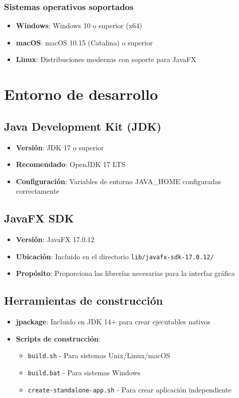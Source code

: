 \subsubsection{Sistemas operativos soportados}
\begin{itemize}
    \item \textbf{Windows}: Windows 10 o superior (x64)
    \item \textbf{macOS}: macOS 10.15 (Catalina) o superior
    \item \textbf{Linux}: Distribuciones modernas con soporte para JavaFX
\end{itemize}

\section{Entorno de desarrollo}

\subsection{Java Development Kit (JDK)}
\begin{itemize}
    \item \textbf{Versión}: JDK 17 o superior
    \item \textbf{Recomendado}: OpenJDK 17 LTS
    \item \textbf{Configuración}: Variables de entorno JAVA\_HOME configuradas correctamente
\end{itemize}

\subsection{JavaFX SDK}
\begin{itemize}
    \item \textbf{Versión}: JavaFX 17.0.12
    \item \textbf{Ubicación}: Incluido en el directorio \texttt{lib/javafx-sdk-17.0.12/}
    \item \textbf{Propósito}: Proporciona las librerías necesarias para la interfaz gráfica
\end{itemize}

\subsection{Herramientas de construcción}
\begin{itemize}
    \item \textbf{jpackage}: Incluido en JDK 14+ para crear ejecutables nativos
    \item \textbf{Scripts de construcción}: 
    \begin{itemize}
        \item \texttt{build.sh} - Para sistemas Unix/Linux/macOS
        \item \texttt{build.bat} - Para sistemas Windows
        \item \texttt{create-standalone-app.sh} - Para crear aplicación independiente
    \end{itemize}
\end{itemize}

